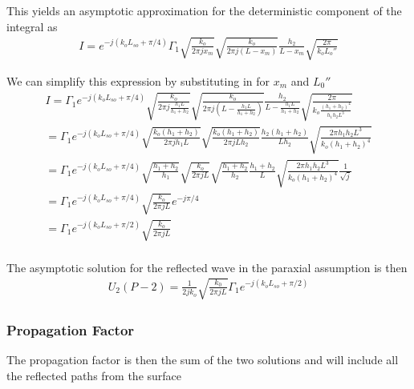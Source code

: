 This yields an asymptotic approximation for the deterministic component of the integral as
\begin{equation}
\begin{gathered}
I = e^{-j\left(k_oL_{so}+\pi/4\right)}\Gamma_1 \sqrt{\frac{k_o}{2\pi jx_m}}\sqrt{\frac{k_o}{2\pi j (L-x_m)}}\frac{h_2}{L-x_m}\sqrt{\frac{2\pi}{k_oL_o''}} 
\end{gathered}
\label{mp_eq:26}
\end{equation}

We can simplify this expression by substituting in for $x_m$ and $L_0''$
\begin{equation}
\begin{gathered}
I= \Gamma_1e^{-j\left(k_oL_{so}+\pi/4\right)}\sqrt{\frac{k_o}{2\pi j\frac{h_1L}{h_1+h_2}}}\sqrt{\frac{k_o}{2\pi j (L-\frac{h_1L}{h_1+h_2})}}\frac{h_2}{L-\frac{h_1L}{h_1+h_2}}\sqrt{\frac{2\pi}{k_o\frac{(h_1+h_2)^4}{h_1h_2L^3}}} \\
= \Gamma_1e^{-j\left(k_oL_{so}+\pi/4\right)} \sqrt{\frac{k_o(h_1+h_2)}{2\pi jh_1L}}\sqrt{\frac{k_o(h_1+h_2)}{2\pi jLh_2}}\frac{h_2(h_1+h_2)}{Lh_2}\sqrt{\frac{2\pi h_1h_2L^3}{k_o(h_1+h_2)^4}} \\
= \Gamma_1e^{-j\left(k_oL_{so}+\pi/4\right)}  \sqrt{\frac{h_1+h_2}{h_1}}\sqrt{\frac{k_o}{2\pi j L}}\sqrt{\frac{h_1+h_2}{h_2}}\frac{h_1+h_2}{L}\sqrt{\frac{2\pi h_1h_2L^3}{k_o(h_1+h_2)^4}}\frac{1}{\sqrt{j}} \\
= \Gamma_1e^{-j\left(k_oL_{so}+\pi/4\right)}\sqrt{\frac{k_o}{2\pi jL}}e^{-j\pi/4} \\
= \Gamma_1e^{-j\left(k_oL_{so}+\pi/2\right)}\sqrt{\frac{k_o}{2\pi jL}} \\
\end{gathered}
\label{mp_eq:27}
\end{equation}

The asymptotic solution for the reflected wave in the paraxial assumption is then
\begin{equation}
\begin{gathered}
U_2(P-2)= \frac{1}{2jk_o}\sqrt{\frac{k_0}{2\pi jL}} \Gamma_1e^{-j\left(k_oL_{so}+\pi/2\right)}
\label{mp_eq:27a}
\end{gathered}
\end{equation}
\renewcommand{\baselinestretch}{2} \small\normalsize

\subsubsection{Propagation Factor}
The propagation factor is then the sum of the two solutions and will include all the reflected paths from the surface

